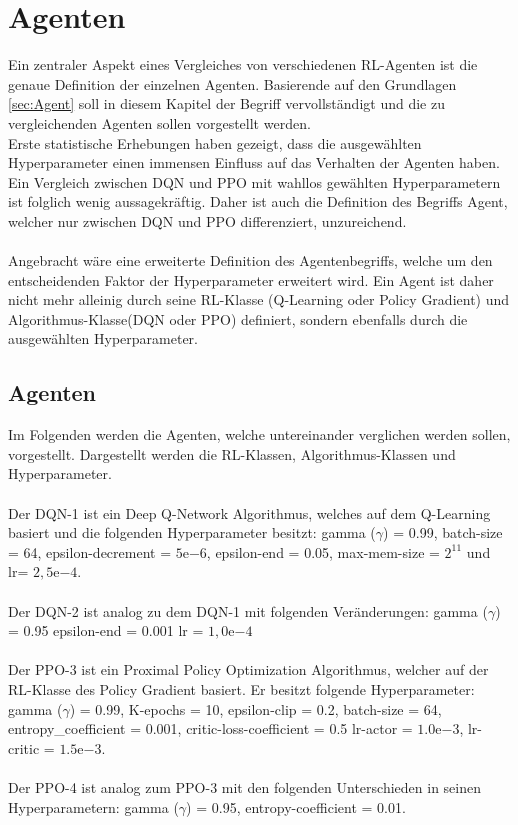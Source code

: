 \chapter{Agenten} \label{chap:Agenten}
Ein zentraler Aspekt eines Vergleiches von verschiedenen RL-Agenten ist die genaue Definition der einzelnen Agenten. Basierende auf den Grundlagen \ref{sec:Agent} soll in diesem Kapitel der Begriff vervollständigt und die zu vergleichenden Agenten sollen vorgestellt werden.\\
Erste statistische Erhebungen haben gezeigt, dass die ausgewählten Hyperparameter einen immensen Einfluss auf das Verhalten der Agenten haben. Ein Vergleich zwischen DQN und PPO mit wahllos gewählten Hyperparametern ist folglich wenig aussagekräftig. Daher ist auch die Definition des Begriffs Agent, welcher nur zwischen DQN und PPO differenziert, unzureichend.\\
\\Angebracht wäre eine erweiterte Definition des Agentenbegriffs, welche um den entscheidenden Faktor der Hyperparameter erweitert wird. Ein Agent ist daher nicht mehr alleinig durch seine RL-Klasse (Q-Learning oder Policy Gradient) und Algorithmus-Klasse(DQN oder PPO) definiert, sondern ebenfalls durch die ausgewählten Hyperparameter.

\section{Agenten}
Im Folgenden werden die Agenten, welche untereinander verglichen werden sollen, vorgestellt. Dargestellt werden die RL-Klassen, Algorithmus-Klassen und Hyperparameter.\\
\\ Der DQN-1 ist ein Deep Q-Network Algorithmus, welches auf dem Q-Learning basiert und die folgenden Hyperparameter besitzt: gamma ($\gamma$) = 0.99,
batch-size = 64, epsilon-decrement = $5\mathrm{e}{-6}$, epsilon-end = 0.05, max-mem-size = $2^{11}$ und lr= $2,5\mathrm{e}{-4}$.\\
\\Der DQN-2 ist analog zu dem DQN-1 mit folgenden Veränderungen: gamma ($\gamma$) = 0.95 epsilon-end = 0.001 lr = $1,0\mathrm{e}{-4}$\\
\\Der PPO-3 ist ein Proximal Policy Optimization Algorithmus, welcher auf der RL-Klasse des Policy Gradient basiert. Er besitzt folgende Hyperparameter: gamma ($\gamma$) = 0.99, K-epochs = 10, epsilon-clip = 0.2, batch-size = 64, entropy\_coefficient = 0.001, critic-loss-coefficient = 0.5 lr-actor = $1.0\mathrm{e}{-3}$, lr-critic = $1.5\mathrm{e}{-3}$.\\
\\Der PPO-4 ist analog zum PPO-3 mit den folgenden Unterschieden in seinen Hyperparametern: gamma ($\gamma$) = 0.95, entropy-coefficient = 0.01.\\

